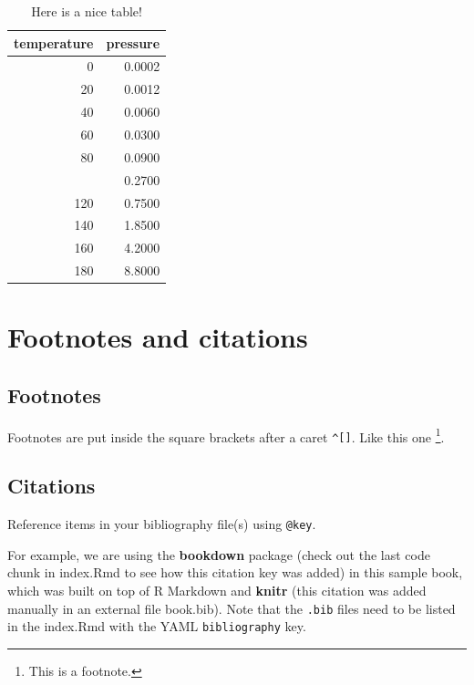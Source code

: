 \documentclass[
  12pt,
]{book}
\theoremstyle{definition}
\theoremstyle{definition}
\theoremstyle{definition}
\theoremstyle{definition}
\theoremstyle{remark}
\begin{document}
\begin{table}

\caption{\label{tab:nice-tab}Here is a nice table!}
\centering
\begin{tabular}[t]{rr}
\toprule
temperature & pressure\\
\midrule
0 & 0.0002\\
20 & 0.0012\\
40 & 0.0060\\
60 & 0.0300\\
80 & 0.0900\\
\addlinespace
100 & 0.2700\\
120 & 0.7500\\
140 & 1.8500\\
160 & 4.2000\\
180 & 8.8000\\
\bottomrule
\end{tabular}
\end{table}

\hypertarget{footnotes-and-citations}{%
\chapter{Footnotes and citations}\label{footnotes-and-citations}}

\hypertarget{footnotes}{%
\section{Footnotes}\label{footnotes}}

Footnotes are put inside the square brackets after a caret \texttt{\^{}{[}{]}}. Like this one \footnote{This is a footnote.}.

\hypertarget{citations}{%
\section{Citations}\label{citations}}

Reference items in your bibliography file(s) using \texttt{@key}.

For example, we are using the \textbf{bookdown} package \citep{R-bookdown} (check out the last code chunk in index.Rmd to see how this citation key was added) in this sample book, which was built on top of R Markdown and \textbf{knitr} \citep{xie2015} (this citation was added manually in an external file book.bib).
Note that the \texttt{.bib} files need to be listed in the index.Rmd with the YAML \texttt{bibliography} key.
\end{document}
